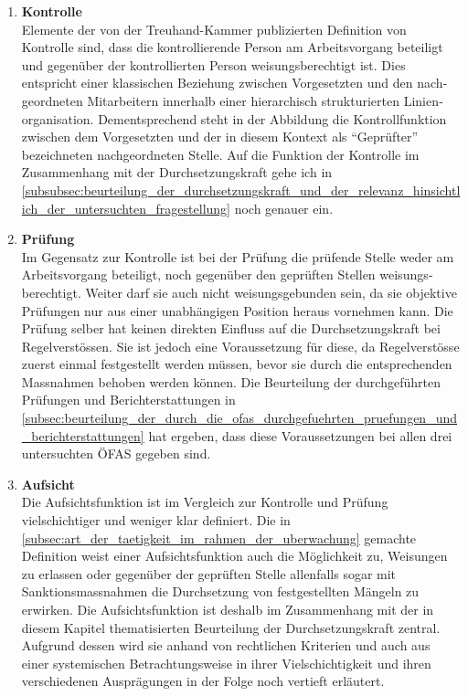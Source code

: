 \documentclass[10pt]{article}
\begin{document}
\begin{enumerate}
    \item \textbf{Kontrolle}\\
Elemente der von der Treuhand-Kammer publizierten Definition von Kontrolle sind, dass die kontrollierende Person am Arbeits­vor­gang beteiligt und gegenüber der kontrollierten Person weisungsberechtigt ist. Dies entspricht einer klassischen Beziehung zwischen Vorgesetzten und den nach­geordneten Mitarbeitern innerhalb einer hierarchisch strukturierten Linien­organisation. Dementsprechend steht in der Abbildung die Kontrollfunktion zwischen dem Vorgesetzten und der in diesem Kontext als “{}Geprüfter”{} bezeichneten nach­geordneten Stelle. Auf die Funktion der Kontrolle im Zusammenhang mit der Durchsetzungskraft gehe ich in \vref{subsubsec:beurteilung_der_durchsetzungskraft_und_der_relevanz_hinsichtlich_der_untersuchten_fragestellung} noch genauer ein.

    \item \textbf{Prüfung}\\
Im Gegensatz zur Kontrolle ist bei der Prüfung die prüfende Stelle weder am Arbeitsvorgang beteiligt, noch gegenüber den geprüften Stellen weisungs­berechtigt. Weiter darf sie auch nicht weisungsgebunden sein, da sie objektive Prüfungen nur aus einer unabhängigen Position heraus vornehmen kann. Die Prüfung selber hat keinen direkten Einfluss auf die Durchsetzungskraft bei Regelverstössen. Sie ist jedoch eine Voraussetzung für diese, da Regelverstösse zuerst einmal festgestellt werden müssen, bevor sie durch die entsprechenden Massnahmen behoben werden können. Die Beurteilung der durchgeführten Prüfungen und Berichterstattungen in \vref{subsec:beurteilung_der_durch_die_ofas_durchgefuehrten_pruefungen_und_berichterstattungen} hat ergeben, dass diese Voraussetzungen bei allen drei untersuchten ÖFAS gegeben sind.

    \item \textbf{Aufsicht}\\
Die Aufsichtsfunktion ist im Vergleich zur Kontrolle und Prüfung vielschichtiger und weniger klar definiert. Die in \vref{subsec:art_der_taetigkeit_im_rahmen_der_uberwachung} gemachte Definition weist einer Aufsichtsfunktion auch die Möglichkeit zu, Weisungen zu erlassen oder ge­gen­über der geprüften Stelle allenfalls sogar mit Sanktionsmassnahmen die Durch­setzung von festgestellten Mängeln zu erwirken. Die Aufsichtsfunktion ist deshalb im Zusammenhang mit der in diesem Kapitel thematisierten Beurteilung der Durchsetzungskraft zentral. Aufgrund dessen wird sie anhand von rechtlichen Kriterien und auch aus einer systemischen Betrachtungsweise in ihrer Viel­schich­tigkeit und ihren verschiedenen Ausprägungen in der Folge noch vertieft erläutert.

\end{enumerate}
\end{document}
